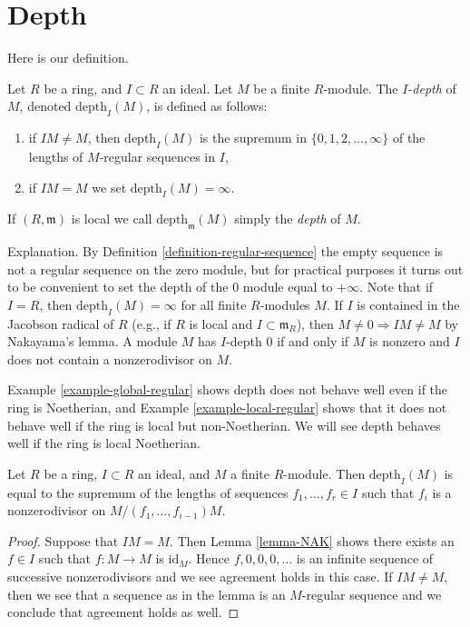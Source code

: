 \section{Depth}
\label{section-depth}

\noindent
Here is our definition.

\begin{definition}
\label{definition-depth}
Let $R$ be a ring, and $I \subset R$ an ideal. Let $M$ be a finite $R$-module.
The {\it $I$-depth} of $M$, denoted $\text{depth}_I(M)$, is defined as follows:
\begin{enumerate}
\item if $IM \not = M$, then $\text{depth}_I(M)$ is the supremum in
$\{0, 1, 2, \ldots, \infty\}$ of the lengths of $M$-regular sequences in $I$,
\item if $IM = M$ we set $\text{depth}_I(M) = \infty$.
\end{enumerate}
If $(R, \mathfrak m)$ is local we call $\text{depth}_{\mathfrak m}(M)$ simply
the {\it depth} of $M$.
\end{definition}

\noindent
Explanation. By Definition \ref{definition-regular-sequence} the empty
sequence is not a regular sequence on the zero module, but for practical
purposes it turns out to be convenient to set the depth of the $0$ module
equal to $+\infty$. Note that if $I = R$, then $\text{depth}_I(M) = \infty$
for all finite $R$-modules $M$. If $I$ is contained in the Jacobson radical
of $R$ (e.g., if $R$ is local and $I \subset \mathfrak m_R$), then
$M \not = 0 \Rightarrow IM \not = M$ by Nakayama's lemma.
A module $M$ has $I$-depth $0$ if and only if $M$ is nonzero and $I$ does
not contain a nonzerodivisor on $M$.

\medskip\noindent
Example \ref{example-global-regular} shows depth does not
behave well even if the ring is Noetherian, and Example
\ref{example-local-regular} shows that it does not
behave well if the ring is local but non-Noetherian.
We will see depth behaves well if the ring is local Noetherian.

\begin{lemma}
\label{lemma-depth-weak-sequence}
Let $R$ be a ring, $I \subset R$ an ideal, and $M$ a finite $R$-module.
Then $\text{depth}_I(M)$ is equal to the supremum of the lengths of
sequences $f_1, \ldots, f_r \in I$ such that $f_i$ is a nonzerodivisor
on $M/(f_1, \ldots, f_{i - 1})M$.
\end{lemma}

\begin{proof}
Suppose that $IM = M$. Then Lemma \ref{lemma-NAK} shows there exists
an $f \in I$ such that $f : M \to M$ is $\text{id}_M$. Hence
$f, 0, 0, 0, \ldots$ is an infinite sequence of successive
nonzerodivisors and we see agreement holds in this case.
If $IM \not =  M$, then we see that a sequence as in the lemma
is an $M$-regular sequence and we conclude that agreement holds as well.
\end{proof}

